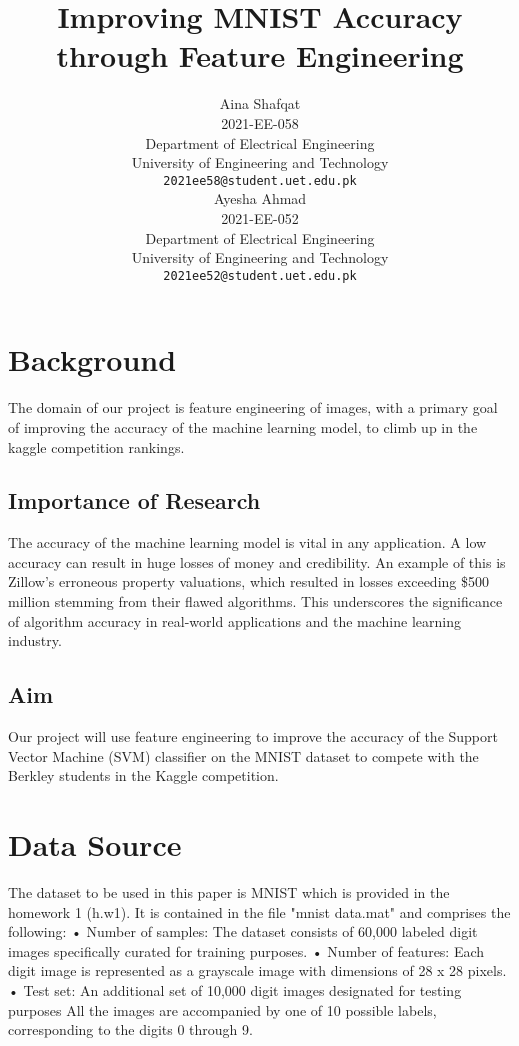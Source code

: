 \documentclass{article}
\title{Improving MNIST Accuracy through Feature Engineering}
\author{
  Aina Shafqat \\
  2021-EE-058 \\
  Department of Electrical Engineering \\
  University of Engineering and Technology \\
  \texttt{2021ee58@student.uet.edu.pk} \\
  \And
  Ayesha Ahmad \\
  2021-EE-052 \\
  Department of Electrical Engineering \\
  University of Engineering and Technology \\
  \texttt{2021ee52@student.uet.edu.pk} \\
}
\begin{document}
\maketitle
\section{Background}

The domain of our project is feature engineering of images, with a primary goal of improving the accuracy of the machine learning model, to climb up in the kaggle competition rankings.


\subsection{Importance of Research}

The accuracy of the machine learning model is vital in any application. A low accuracy can result in huge losses of money and credibility. 
An example of this is Zillow's erroneous property valuations, which resulted in losses exceeding \$500 million stemming from their flawed algorithms. This underscores the significance of algorithm accuracy in real-world applications and the machine learning industry. 

\subsection{Aim}

Our project will use feature engineering to improve the accuracy of the Support Vector Machine (SVM) classifier on the MNIST dataset to compete with the Berkley students in the Kaggle competition.


\section{Data Source}

The dataset to be used in this paper is MNIST which is provided in the homework 1 (h.w1). It is contained in the file "mnist data.mat" and comprises the following:
•	Number of samples: The dataset consists of 60,000 labeled digit images specifically curated for training purposes.
•	Number of features: Each digit image is represented as a grayscale image with dimensions of 28 x 28 pixels. 
•	Test set: An additional set of 10,000 digit images designated for testing purposes
All the images are accompanied by one of 10 possible labels, corresponding to the digits 0 through 9.
\end{document}
